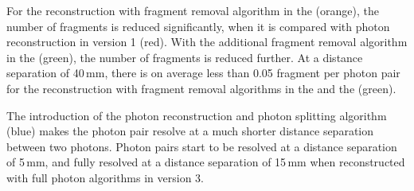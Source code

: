 

For the reconstruction with fragment removal algorithm in the \ECAL (orange), the number of fragments is reduced significantly, when it is compared with photon reconstruction in \pandora version 1 (red). With the additional fragment removal algorithm in the \HCAL (green), the number of fragments is reduced further. At a distance separation of  40\,mm,  there is on average less than 0.05 fragment per photon pair for the reconstruction with fragment removal algorithms in the \ECAL and the \HCAL  (green).

The introduction of the photon reconstruction and photon splitting algorithm (blue) makes the photon pair resolve at a much shorter distance separation between two photons. Photon pairs start to be resolved at a distance separation of 5\,mm, and fully resolved at a distance separation of 15\,mm when reconstructed with full photon algorithms in \pandora version 3.


